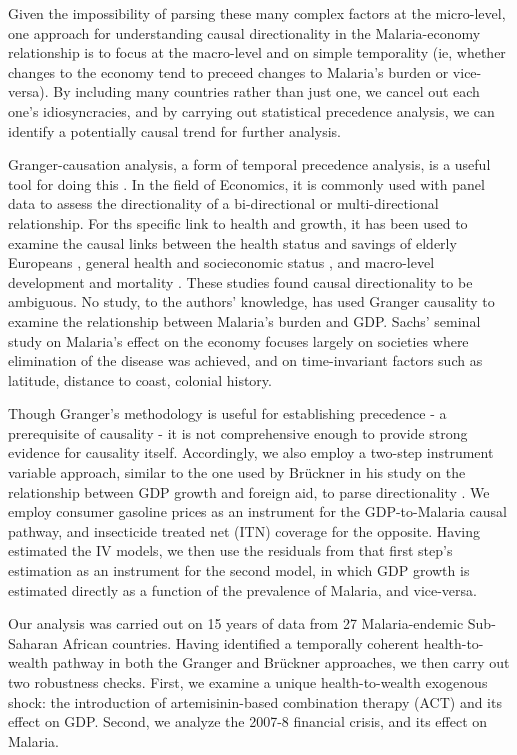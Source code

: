 \documentclass[9pt,twocolumn,twoside,lineno]{pnas-new}
\begin{document}
Given the impossibility of parsing these many complex factors at the micro-level, one approach for understanding causal directionality in the Malaria-economy relationship is to focus at the macro-level and on simple temporality (ie, whether changes to the economy tend to preceed changes to Malaria’s burden or vice-versa). By including many countries rather than just one, we cancel out each one’s idiosyncracies, and by carrying out statistical precedence analysis, we can identify a potentially causal trend for further analysis. 

Granger-causation analysis, a form of temporal precedence analysis, is a useful tool for doing this \cite{Granger_undated-wn, Molenaar2018-ss, Koller2016-rv, Granger1896-di, Clarke_JA2016-ik}. In the field of Economics, it is commonly used with panel data to assess the directionality of a bi-directional \cite{Law_2013, Joerding1986, ADALI_2017} or multi-directional \cite{Akbas_2013} relationship. For ths specific link to health and growth, it has been used to examine the causal links between the health status and savings of elderly Europeans \cite{Andreyeva2007-zq}, general health and socieconomic status \cite{Adams2003-wl}, and macro-level development and mortality \cite{Clarke_JA2016-ik}. These studies found causal directionality to be ambiguous. No study, to the authors’ knowledge, has used Granger causality to examine the relationship between Malaria’s burden and GDP. Sachs' seminal study on Malaria's effect on the economy \cite{Sachs2002-ig} focuses largely on societies where elimination of the disease was achieved, and on time-invariant factors such as latitude, distance to coast, colonial history. 

Though Granger's methodology is useful for establishing precedence - a prerequisite of causality - it is not comprehensive enough to provide strong evidence for causality itself. Accordingly, we also employ a two-step instrument variable approach, similar to the one used by Brückner in his study on the relationship between GDP growth and foreign aid, to parse directionality \cite{bruckner2011}. We employ consumer gasoline prices as an instrument for the GDP-to-Malaria causal pathway, and insecticide treated net (ITN) coverage for the opposite. Having estimated the IV models, we then use the residuals from that first step's estimation as an instrument for the second model, in which GDP growth is estimated directly as a function of the prevalence of Malaria, and vice-versa.

Our analysis was carried out on 15 years of data from 27 Malaria-endemic Sub-Saharan African countries. Having identified a temporally coherent health-to-wealth pathway in both the Granger and Brückner approaches, we then carry out two robustness checks. First, we examine a unique health-to-wealth exogenous shock: the introduction of artemisinin-based combination therapy (ACT) and its effect on GDP. Second, we analyze the 2007-8 financial crisis, and its effect on Malaria. 
\end{document}
